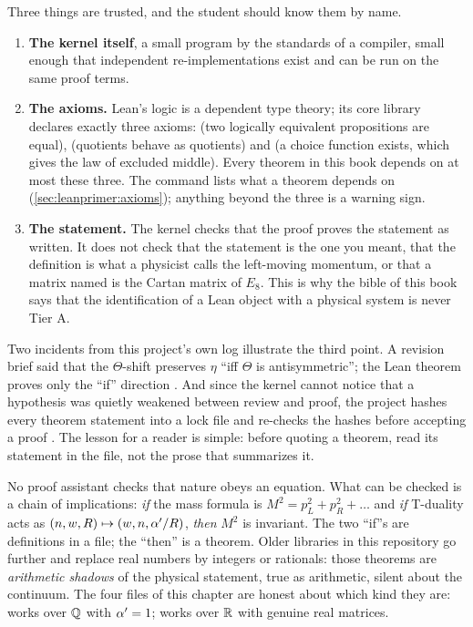 Three things are trusted, and the student should know them by name.
\begin{enumerate}[leftmargin=*,itemsep=1pt]
\item \textbf{The kernel itself}, a small program by the standards of a compiler, small
  enough that independent re-implementations exist and can be run on the same proof terms.
\item \textbf{The axioms.} Lean's logic is a dependent type theory;
  its core library declares exactly three axioms:  (two logically equivalent propositions are
  equal),  (quotients behave as quotients) and 
  (a choice function exists, which gives the law of excluded middle). Every theorem in this
  book depends on at most these three. The command  lists what a
  theorem depends on (\cref{sec:leanprimer:axioms}); anything beyond the three is a
  warning sign.
\item \textbf{The statement.} The kernel checks that the proof proves the statement as
  written. It does not check that the statement is the one you meant, that the definition
   is what a physicist calls the left-moving momentum, or that a matrix
  named  is the Cartan matrix of $E_8$. This is why the bible of this book
  says that the identification of a Lean object with a physical system is never Tier A.
\end{enumerate}

\begin{pitfallbox}
Two incidents from this project's own log illustrate the third point.
A revision brief said that the $\Theta$-shift preserves $\eta$ ``iff $\Theta$ is
antisymmetric''; the Lean theorem proves only the ``if'' direction
. And since the kernel cannot notice that a hypothesis
was quietly weakened between review and proof, the project hashes every theorem statement
into a lock file and re-checks the hashes before accepting a proof
. The lesson for a reader is simple: before quoting a
theorem, read its statement in the  file, not the prose that summarizes it.
\end{pitfallbox}

\begin{physicsbox}
No proof assistant checks that nature obeys an equation. What can be checked is a chain of
implications: \emph{if} the mass formula is $M^2 = p_L^2 + p_R^2 + \dots$ and \emph{if}
T-duality acts as $(n,w,R)\mapsto(w,n,\alpha'/R)$, \emph{then} $M^2$ is invariant. The two
``if''s are definitions in a file; the ``then'' is a theorem. Older libraries in this
repository go further and replace real numbers by integers or rationals: those theorems are
\emph{arithmetic shadows} of the physical statement, true as
arithmetic, silent about the continuum. The four files of this chapter are honest about
which kind they are:  works over $\mathbb{Q}$ with $\alpha'=1$;
 works over $\mathbb{R}$ with genuine real matrices.
\end{physicsbox}

